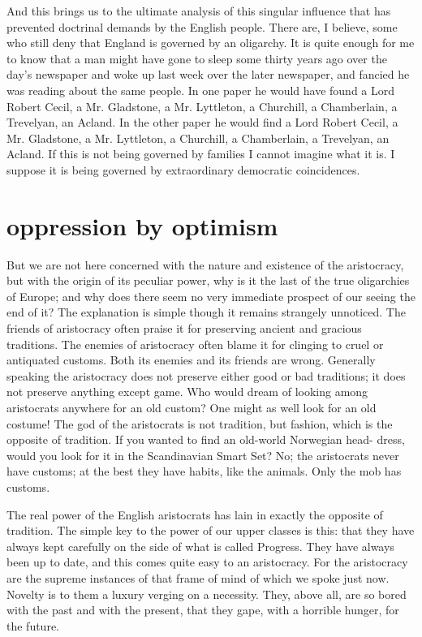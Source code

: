 \documentclass[final,10pt,letterpaper,twocolumn,openany]{book}
\begin{document}
And this brings us to the ultimate analysis of this singular influence
that has prevented doctrinal demands by the English people. There are, I
believe, some who still deny that England is governed by an oligarchy. It
is quite enough for me to know that a man might have gone to sleep some
thirty years ago over the day's newspaper and woke up last week over the
later newspaper, and fancied he was reading about the same people. In one
paper he would have found a Lord Robert Cecil, a Mr. Gladstone, a Mr.
Lyttleton, a Churchill, a Chamberlain, a Trevelyan, an Acland. In the other
paper he would find a Lord Robert Cecil, a Mr. Gladstone, a Mr. Lyttleton,
a Churchill, a Chamberlain, a Trevelyan, an Acland. If this is not being
governed by families I cannot imagine what it is. I suppose it is being
governed by extraordinary democratic coincidences.

\section{oppression by optimism}

    But we are not here concerned with the nature and existence of the
aristocracy, but with the origin of its peculiar power, why is it the last of
the true oligarchies of Europe; and why does there seem no very
immediate prospect of our seeing the end of it? The explanation is simple
though it remains strangely unnoticed. The friends of aristocracy often
praise it for preserving ancient and gracious traditions. The enemies of
aristocracy often blame it for clinging to cruel or antiquated customs. Both
its enemies and its friends are wrong. Generally speaking the aristocracy
does not preserve either good or bad traditions; it does not preserve
anything except game. Who would dream of looking among aristocrats
anywhere for an old custom? One might as well look for an old costume!
The god of the aristocrats is not tradition, but fashion, which is the
opposite of tradition. If you wanted to find an old-world Norwegian head-
dress, would you look for it in the Scandinavian Smart Set? No; the
aristocrats never have customs; at the best they have habits, like the
animals. Only the mob has customs.

The real power of the English aristocrats has lain in exactly the
opposite of tradition. The simple key to the power of our upper classes is
this: that they have always kept carefully on the side of what is called
Progress. They have always been up to date, and this comes quite easy to
an aristocracy. For the aristocracy are the supreme instances of that frame
of mind of which we spoke just now. Novelty is to them a luxury verging
on a necessity. They, above all, are so bored with the past and with the
present, that they gape, with a horrible hunger, for the future.
\end{document}

